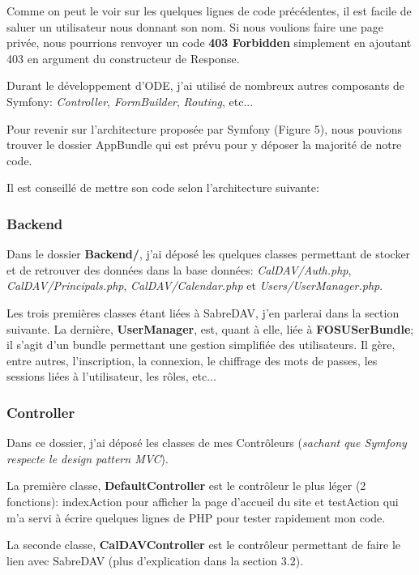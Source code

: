 Comme on peut le voir sur les quelques lignes de code précédentes, il est facile de saluer un utilisateur nous donnant son nom. Si nous voulions faire une page privée, nous pourrions renvoyer un code \textbf{403 Forbidden} simplement en ajoutant 403 en argument du constructeur de Response.

Durant le développement d'ODE, j'ai utilisé de nombreux autres composants de Symfony: \textit{Controller}, \textit{FormBuilder}, \textit{Routing}, etc...

\vspace{1cm}

Pour revenir sur l'architecture proposée par Symfony (Figure 5), nous pouvions trouver le dossier AppBundle qui est prévu pour y déposer la majorité de notre code.

Il est conseillé de mettre son code selon l'architecture suivante:

\subsubsection*{Backend}

Dans le dossier \textbf{Backend/}, j'ai déposé les quelques classes permettant de stocker et de retrouver des données dans la base données: \textit{CalDAV/Auth.php}, \textit{CalDAV/Principals.php}, \textit{CalDAV/Calendar.php} et \textit{Users/UserManager.php}.

Les trois premières classes étant liées à SabreDAV, j'en parlerai dans la section suivante. La dernière, \textbf{UserManager}, est, quant à elle, liée à \textbf{FOSUSerBundle}; il s'agit d'un bundle permettant une gestion simplifiée des utilisateurs. Il gère, entre autres, l'inscription, la connexion, le chiffrage des mots de passes, les sessions liées à l'utilisateur, les rôles, etc...

\subsubsection*{Controller}

Dans ce dossier, j'ai déposé les classes de mes Contrôleurs (\textit{sachant que Symfony respecte le design pattern MVC}).

La première classe, \textbf{DefaultController} est le contrôleur le plus léger (2 fonctions): indexAction pour afficher la page d'accueil du site et testAction qui m'a servi à écrire quelques lignes de PHP pour tester rapidement mon code.

La seconde classe, \textbf{CalDAVController} est le contrôleur permettant de faire le lien avec SabreDAV (plus d'explication dans la section 3.2).

